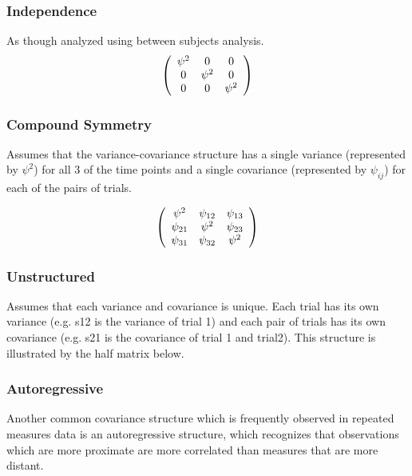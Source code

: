 \documentclass[12pt, a4paper]{article}
\begin{document}
\subsubsection{Independence}

As though analyzed using between subjects analysis.
\[
\left(
\begin{array}{c c c}
\psi^2 & 0 & 0   \\
0 & \psi^2 & 0   \\
0 & 0 & \psi^2   \\
\end{array}%
\right)
\]


\subsubsection{Compound Symmetry}

Assumes that the variance-covariance structure has a single variance (represented by $\psi^2$)
for all 3 of the time points and a single covariance (represented by $\psi_{ij}$) for each of the pairs of trials.

\[
\left(%
\begin{array}{c c c}
\psi^2 &  \psi_{12} & \psi_{13}   \\
\psi_{21} & \psi^2 & \psi_{23}   \\
\psi_{31} & \psi_{32} & \psi^2   \\
\end{array}%
\right)
\]


\subsubsection{Unstructured}

Assumes that each variance and covariance is unique.
Each trial has its own variance (e.g. s12 is the variance of trial 1)
and each pair of trials has its own covariance (e.g. s21 is the covariance of trial 1 and trial2).
This structure is illustrated by the half matrix below.


\subsubsection{Autoregressive}

Another common covariance structure which is frequently observed
in repeated measures data is an autoregressive structure,
which recognizes that observations which are more proximate
are more correlated than measures that are more distant.
\end{document}
